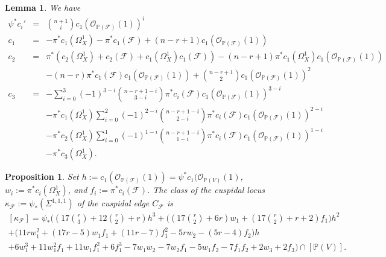 \documentclass[10pt,a4paper]{amsart}
\newtheorem{lemma}{Lemma}
\newtheorem{prop}{Proposition}
\begin{document}
\begin{lemma}\label{chern2}
We have
\begin{eqnarray*}
\psi^*c_i'&=&\binom{n+1}ic_1(\mathcal O_{\mathbb P(\mathcal F)}(1))^i\\
c_1&=&-\pi^*c_1(\Omega^1_X)-\pi^*c_1(\mathcal F)+(n-r+1)c_1(\mathcal O_{\mathbb P(\mathcal F)}(1))\\
c_2&=& \pi^*(c_2(\Omega^1_X)+c_2(\mathcal F)+c_1(\Omega^1_X)c_1(\mathcal F))
-(n-r+1)\pi^*c_1(\Omega^1_X)c_1(\mathcal O_{\mathbb P(\mathcal F)}(1))\\
&&-(n-r)\pi^*c_1(\mathcal F)c_1(\mathcal O_{\mathbb P(\mathcal F)}(1))
+\binom{n-r+1}2c_1(\mathcal O_{\mathbb P(\mathcal F)}(1))^2\\
c_3&=&-\sum_{i=0}^3(-1)^{3-i}\binom{n-r+1-i}{3-i}\pi^*c_i(\mathcal F)c_1(\mathcal O_{\mathbb P(\mathcal F)}(1))^{3-i} \\
&&-\pi^*c_1(\Omega_X^1)\sum_{i=0}^2(-1)^{2-i}\binom{n-r+1-i}{2-i}\pi^*c_i(\mathcal F)c_1(\mathcal O_{\mathbb P(\mathcal F)}(1))^{2-i} \\
&&-\pi^*c_2(\Omega_X^1)\sum_{i=0}^1(-1)^{1-i}\binom{n-r+1-i}{1-i}\pi^*c_i(\mathcal F)c_1(\mathcal O_{\mathbb P(\mathcal F)}(1))^{1-i} \\
&& -\pi^*c_3(\Omega_X^1).
\end{eqnarray*}
\end{lemma}

\begin{prop}\label{cuspscusp}
Set $h:=c_1(\mathcal O_{\mathbb P(\mathcal F)}(1))=\psi^*c_1(\mathcal O_{\mathbb P(V)}(1)$, $w_i:=\pi^*c_i(\Omega^1_X)$, and $f_i:=\pi^*c_i(\mathcal F)$. 
The class of the cuspidal locus $\kappa_\mathcal F:=\psi_*(\Sigma^{1,1,1})$ of the cuspidal edge $C_\mathcal F$ is
\begin{multline*}\textstyle
[\kappa_\mathcal F]=\psi_*\bigl(
(17\binom{r}3 +12\binom{r}2 +r)h^3
+\bigl((17\binom{r}2 + 6r)w_1
 \textstyle +  (17\binom{r}2 +r +2)f_1\bigr)h^2\\
 +\bigl(11rw_1^2+(17r-5)w_1f_1+(11r-7)f_1^2-5rw_2-(5r-4)f_2\bigr)h\\
 +6w_1^3+11w_1^2f_1+11w_1f_1^2+6f_1^3-7w_1w_2
 -7w_2f_1-5w_1f_2-7f_1f_2+2w_3+2f_3\bigr)\cap [\mathbb P(V)].
\end{multline*}
\end{prop}
\end{document}
